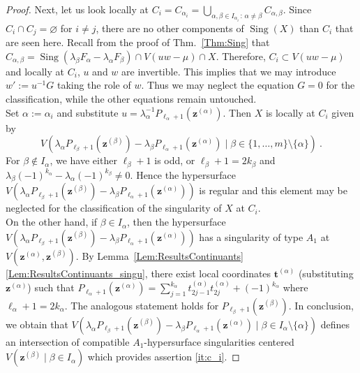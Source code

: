 \documentclass[letter,11pt]{amsart}
\DeclareMathOperator{\Sing}{Sing}
\renewcommand{\t}{\boldsymbol{t}}
\newcommand{\z}{\boldsymbol{z}}
\newcommand{\XX}{X}
\theoremstyle{theorem}
\theoremstyle{definition}
\newcommand{\len}{\ell}
\newcommand{\halflen}{k}
\numberwithin{equation}{section}
\begin{document}
\begin{proof}
	Next, let us look locally at $ C_i = C_{\alpha_i} = \bigcup_{\alpha,\beta \in I_{\alpha_i} \, : \,  \alpha \neq \beta } C_{\alpha, \beta} $. 
	Since $ C_i \cap C_j = \varnothing $ for $ i \neq j $, 
	there are no other components of $ \Sing(\XX) $ than $ C_i$ that are seen here.
	Recall from the proof of Thm.~\ref{Thm:Sing} that
	$ %
		C_{\alpha,\beta} = 
		\Sing (\lambda_\beta F_\alpha - \lambda_\alpha F_\beta )
		\cap V ( u w  - \mu)
		\cap 
		\XX 
	$. %
	Therefore, $ C_i \subset V (uw- \mu) $
	and locally at $ C_i $, 
	$ u $ and $ w $ are invertible. 
	This implies that we may introduce $ w' := u^{-1} G $ taking the role of $ w $.
	Thus we may neglect the equation $ G = 0 $ for the classification,
	while the other equations remain untouched. 	
	\\
	Set $ \alpha := \alpha_i $
	and substitute $ u = \lambda_\alpha^{-1} P_{\len_\alpha +1} ( \z^{(\alpha)}) $.
	Then $ X $ is locally at $ C_i $ given by 
	\[
		V (
		\lambda_\alpha P_{\len_\beta +1} ( \z^{(\beta)})  
		- \lambda_\beta P_{\len_\alpha +1} ( \z^{(\alpha)})
		\mid \beta \in \{ 1, \ldots, m \} \setminus \{ \alpha \}
		)	
		\ . 
	\]
	For $ \beta \notin I_\alpha $,
	we have either $ \len_\beta + 1 $ is odd, or 
	$ \len_\beta + 1  = 2 \halflen_\beta $ and $ \lambda_\beta (-1)^{\halflen_{\alpha}} - \lambda_{\alpha} (-1)^{\halflen_\beta} \neq 0 $.
	Hence  
	the hypersurface $ V (\lambda_\alpha P_{\len_\beta +1} ( \z^{(\beta)})  
	- \lambda_\beta P_{\len_\alpha +1} ( \z^{(\alpha)})) $ is regular
	and this element may be neglected for the classification of the singularity of $ \XX $ at $ C_i $. 	 
	\\
	On the other hand, if $ \beta \in I_\alpha $, 
	then the hypersurface 
	$ V (\lambda_\alpha P_{\len_\beta +1} ( \z^{(\beta)})  
	- \lambda_\beta P_{\len_\alpha +1} ( \z^{(\alpha)}) 
	) $ has a singularity of type $ A_1 $ at $ V (\z^{({\alpha})}, \z^{(\beta)}) $.
	By Lemma~\ref{Lem:ResultsContinuants}\eqref{Lem:ResultsContinuants_singu}, there exist local coordinates $ \t^{(\alpha)} $ 
	(substituting $ \z^{(\alpha)} $)
	such that 
	$
	P_{\len_\alpha +1} ( \z^{(\alpha)}) = \sum_{j=1}^{\halflen_\alpha} t_{2j-1}^{(\alpha)} t_{2j}^{(\alpha)} + (-1)^{\halflen_\alpha}
	$
	where $ \len_\alpha + 1 = 2 k_\alpha $.
	The analogous statement holds for $ P_{\len_\beta +1} ( \z^{(\beta)}) $. 
	In conclusion,
	we obtain that  
	$ V (
	\lambda_\alpha P_{\len_\beta +1} ( \z^{(\beta)})  
	- \lambda_\beta P_{\len_\alpha +1} ( \z^{(\alpha)})
	\mid \beta \in I_\alpha \setminus \{ \alpha \}
	) $
	defines an intersection of compatible $ A_1 $-hypersurface singularities
	centered $ V( \z^{(\beta)} \mid 
	\beta \in I_\alpha ) $ which provides assertion \eqref{it:c_i}.
\end{proof}
\end{document}
